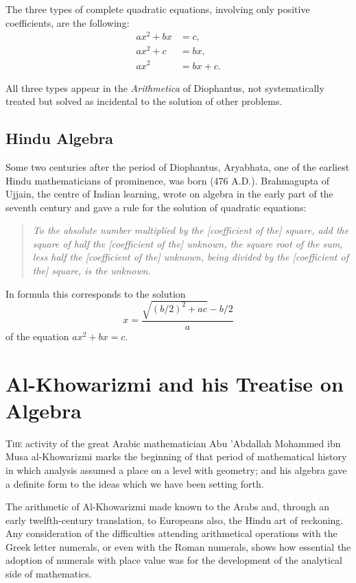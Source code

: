 \documentclass[11pt,a4paper,twoside]{book}
\begin{document}
The three types of complete quadratic equations, involving only positive coefficients, are the following:
\begin{align}
ax^2 + bx &= c,\\
ax^2 + c &= bx,\\
ax^2 &= bx + c.
\end{align}

All three types appear in the \textit{Arithmetica} of Diophantus, not systematically treated but solved as incidental to the solution of other problems.

\section{Hindu Algebra}

Some two centuries after the period of Diophantus, Aryabhata, one of the earliest Hindu mathematicians of prominence, was born (476 A.D.). Brahmagupta of Ujjain, the centre of Indian learning, wrote on algebra in the early part of the seventh century and gave a rule for the solution of quadratic equations:

\begin{quote}
\textit{To the absolute number multiplied by the [coefficient of the] square, add the square of half the [coefficient of the] unknown, the square root of the sum, less half the [coefficient of the] unknown, being divided by the [coefficient of the] square, is the unknown.}
\end{quote}

In formula this corresponds to the solution
\[x = \frac{\sqrt{(b/2)^2 + ac} - b/2}{a}\]
of the equation $ax^2 + bx = c$.

\chapter{Al-Khowarizmi and his Treatise on Algebra}

\lettrine[lines=3]{T}{he} activity of the great Arabic mathematician Abu 'Abdallah Mohammed ibn Musa al-Khowarizmi marks the beginning of that period of mathematical history in which analysis assumed a place on a level with geometry; and his algebra gave a definite form to the ideas which we have been setting forth.

The arithmetic of Al-Khowarizmi made known to the Arabs and, through an early twelfth-century translation, to Europeans also, the Hindu art of reckoning. Any consideration of the difficulties attending arithmetical operations with the Greek letter numerals, or even with the Roman numerals, shows how essential the adoption of numerals with place value was for the development of the analytical side of mathematics.
\end{document}
